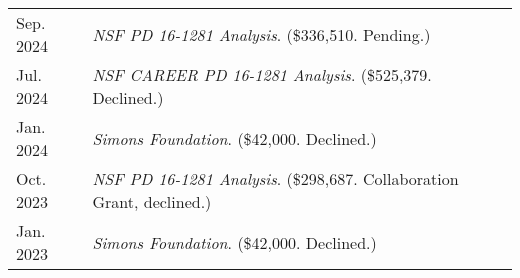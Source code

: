 
    \medskip


    \medskip
    
    \begin{center}
    {
    \renewcommand{\arraystretch}{1.5}
    \begin{longtable}{p{}  p{}}
     Sep.  2024 & \textit{NSF PD 16-1281 Analysis}. (\$336,510. Pending.) \\ 
 Jul.  2024 & \textit{NSF CAREER PD 16-1281 Analysis}. (\$525,379. Declined.) \\ 
 Jan.  2024 & \textit{Simons Foundation}. (\$42,000. Declined.) \\ 
 Oct.  2023 & \textit{NSF PD 16-1281 Analysis}. (\$298,687. Collaboration Grant, declined.) \\ 
 Jan.  2023 & \textit{Simons Foundation}. (\$42,000. Declined.) 
    \end{longtable}
    } 
    \end{center}

    \vspace{-1em}
    